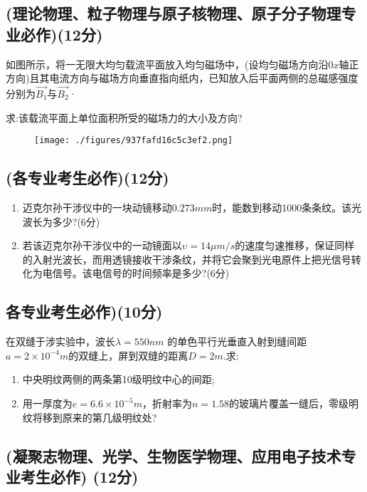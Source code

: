 \subsection{(理论物理、粒子物理与原子核物理、原子分子物理专业必作)(12分)}
如图所示，将一无限大均匀载流平面放入均匀磁场中，(设均匀磁场方向沿$0x$轴正方向)且其电流方向与磁场方向垂直指向纸内，已知放入后平面两侧的总磁感强度分别为$\vec{B_1}$与$\vec{B_2}$·

求:该载流平面上单位面积所受的磁场力的大小及方向?
\begin{figure}[ht]
\centering
\texttt{[image: ./figures/937fafd16c5c3ef2.png]}
\caption{} \label{fig_CD07_2}
\end{figure}
\subsection{(各专业考生必作)(12分)}
\begin{enumerate}
\item 迈克尔孙干涉仪中的一块动镜移动$0.273mm$时，能数到移动1000条条纹。该光波长为多少?(6分)
\item 若该迈克尔孙干涉仪中的一动镜面以$\upsilon=14\mu m/s$的速度匀速推移，保证同样的入射光波长，而用透镜接收干涉条纹，并将它会聚到光电原件上把光信号转化为电信号。该电信号的时间频率是多少?(6分)
\end{enumerate}
\subsection{各专业考生必作)(10分)}
在双缝于涉实验中，波长$\lambda=550nm$ 的单色平行光垂直入射到缝间距$a=2\times10^{-4}m$的双缝上，屏到双缝的距离$D=2m$.求:
\begin{enumerate}
\item 中央明纹两侧的两条第10级明纹中心的间距;
\item 用一厚度为$e=6.6\times10^{-5}m$，折射率为$n=1.58$的玻璃片覆盖一缝后，零级明纹将移到原来的第几级明纹处?
\end{enumerate}
\subsection{(凝聚志物理、光学、生物医学物理、应用电子技术专业考生必作)
(12分)}